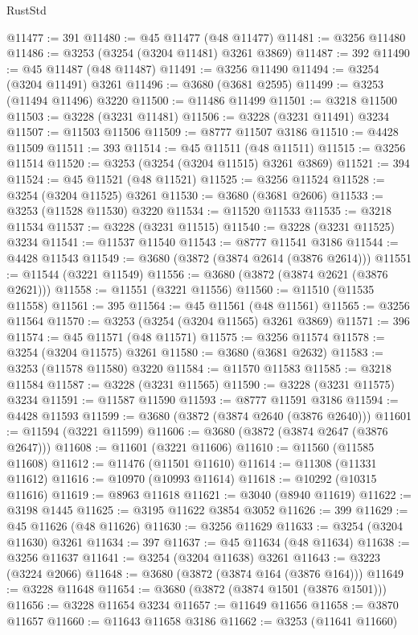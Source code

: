 \begin{lexlean}{RustStd}
\begin{coremodule}
@11477 := 391
@11480 := @45 @11477 (@48 @11477)
@11481 := @3256 @11480
@11486 := @3253 (@3254 (@3204 @11481) @3261 @3869)
@11487 := 392
@11490 := @45 @11487 (@48 @11487)
@11491 := @3256 @11490
@11494 := @3254 (@3204 @11491) @3261
@11496 := @3680 (@3681 @2595)
@11499 := @3253 (@11494 @11496) @3220
@11500 := @11486 @11499
@11501 := @3218 @11500
@11503 := @3228 (@3231 @11481)
@11506 := @3228 (@3231 @11491) @3234
@11507 := @11503 @11506
@11509 := @8777 @11507 @3186
@11510 := @4428 @11509
@11511 := 393
@11514 := @45 @11511 (@48 @11511)
@11515 := @3256 @11514
@11520 := @3253 (@3254 (@3204 @11515) @3261 @3869)
@11521 := 394
@11524 := @45 @11521 (@48 @11521)
@11525 := @3256 @11524
@11528 := @3254 (@3204 @11525) @3261
@11530 := @3680 (@3681 @2606)
@11533 := @3253 (@11528 @11530) @3220
@11534 := @11520 @11533
@11535 := @3218 @11534
@11537 := @3228 (@3231 @11515)
@11540 := @3228 (@3231 @11525) @3234
@11541 := @11537 @11540
@11543 := @8777 @11541 @3186
@11544 := @4428 @11543
@11549 := @3680 (@3872 (@3874 @2614 (@3876 @2614)))
@11551 := @11544 (@3221 @11549)
@11556 := @3680 (@3872 (@3874 @2621 (@3876 @2621)))
@11558 := @11551 (@3221 @11556)
@11560 := @11510 (@11535 @11558)
@11561 := 395
@11564 := @45 @11561 (@48 @11561)
@11565 := @3256 @11564
@11570 := @3253 (@3254 (@3204 @11565) @3261 @3869)
@11571 := 396
@11574 := @45 @11571 (@48 @11571)
@11575 := @3256 @11574
@11578 := @3254 (@3204 @11575) @3261
@11580 := @3680 (@3681 @2632)
@11583 := @3253 (@11578 @11580) @3220
@11584 := @11570 @11583
@11585 := @3218 @11584
@11587 := @3228 (@3231 @11565)
@11590 := @3228 (@3231 @11575) @3234
@11591 := @11587 @11590
@11593 := @8777 @11591 @3186
@11594 := @4428 @11593
@11599 := @3680 (@3872 (@3874 @2640 (@3876 @2640)))
@11601 := @11594 (@3221 @11599)
@11606 := @3680 (@3872 (@3874 @2647 (@3876 @2647)))
@11608 := @11601 (@3221 @11606)
@11610 := @11560 (@11585 @11608)
@11612 := @11476 (@11501 @11610)
@11614 := @11308 (@11331 @11612)
@11616 := @10970 (@10993 @11614)
@11618 := @10292 (@10315 @11616)
@11619 := @8963 @11618
@11621 := @3040 (@8940 @11619)
@11622 := @3198 @1445
@11625 := @3195 @11622 @3854 @3052
@11626 := 399
@11629 := @45 @11626 (@48 @11626)
@11630 := @3256 @11629
@11633 := @3254 (@3204 @11630) @3261
@11634 := 397
@11637 := @45 @11634 (@48 @11634)
@11638 := @3256 @11637
@11641 := @3254 (@3204 @11638) @3261
@11643 := @3223 (@3224 @2066)
@11648 := @3680 (@3872 (@3874 @164 (@3876 @164)))
@11649 := @3228 @11648
@11654 := @3680 (@3872 (@3874 @1501 (@3876 @1501)))
@11656 := @3228 @11654 @3234
@11657 := @11649 @11656
@11658 := @3870 @11657
@11660 := @11643 @11658 @3186
@11662 := @3253 (@11641 @11660)

\end{coremodule}
\end{lexlean}
